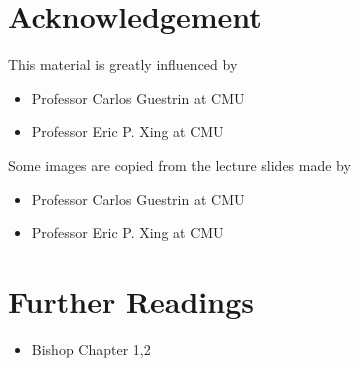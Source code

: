 \documentclass[a4paper]{oblivoir}
\begin{document}
\section*{Acknowledgement}
\noindent This material is greatly influenced by
\begin{itemize}\setlength\itemsep{-\parsep}
\item Professor Carlos Guestrin at CMU \\
\item Professor Eric P. Xing at CMU
\end{itemize}
\indent Some images are copied from the lecture slides made by
\begin{itemize}\setlength\itemsep{-\parsep}
\item Professor Carlos Guestrin at CMU \\
\item Professor Eric P. Xing at CMU
\end{itemize}

\section*{Further Readings}
\begin{itemize}
\setlength\itemsep{-\parsep}
\item Bishop Chapter 1,2
\end{itemize}
\end{document}
